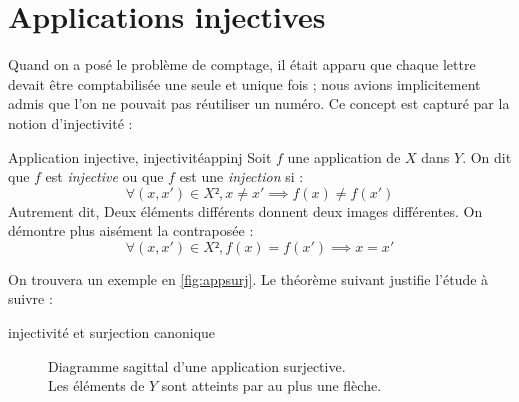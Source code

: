 \documentclass[a4paper,french,final]{memoir}
\begin{document}
  \section{Applications injectives}
  Quand on a posé le problème de comptage, il était apparu que chaque lettre devait être comptabilisée une seule et unique fois ; nous avions implicitement admis que l'on ne pouvait pas réutiliser un numéro. Ce concept est capturé par la notion d'injectivité :
  \begin{defb}{Application injective, injectivité}{appinj}
    Soit $f$ une application de $X$ dans $Y$.
    On dit que $f$ est \emph{injective} ou que $f$ est une \emph{injection} si  : \[\boxed{\forall (x,x') \in X², x\neq x'\implies f(x)\neq f(x')}\]
    Autrement dit, Deux éléments différents donnent deux images différentes. On démontre plus aisément la contraposée :
    \[\boxed{\forall (x,x') \in X², f(x)=f(x')\implies x=x'}\]
  \end{defb}
  On trouvera un exemple en \cref{fig:appsurj}. Le théorème suivant justifie l'étude à suivre : 
  \begin{theoremb}{injectivité et surjection canonique}
  
  \end{theoremb}
  	\begin{figure}[htbp]
	\centering
%
	\caption[Diagramme sagittal d'une application injective]{Diagramme sagittal d'une application surjective.\\ Les éléments de $Y$ sont atteints par au plus une flèche.}
	\label{fig:appinj}
\end{figure}
\end{document}
